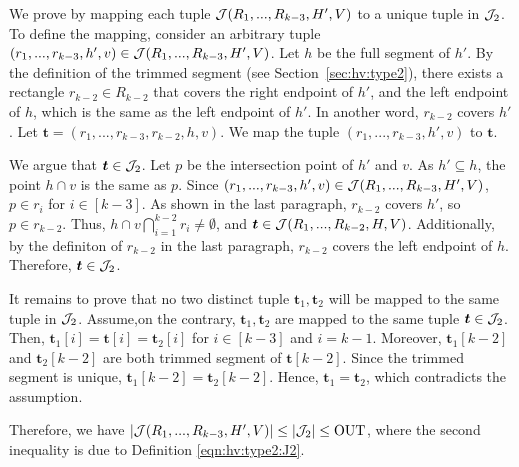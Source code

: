 We prove by mapping each tuple $\mathcal{J}(R_1,...,R_{k-3},H',V)$ to a unique tuple in $\mathcal{J}_2$. 
To define the mapping, consider an arbitrary tuple $(r_1,...,r_{k-3}, h', v) \in \mathcal{J}(R_1,...,R_{k-3},H',V)$. Let $h$ be the full segment of $h'$. By the definition of the trimmed segment (see Section~\ref{sec:hv:type2}), there exists a rectangle $r_{k-2}\in R_{k-2}$ that covers the right endpoint of $h'$, and the left endpoint of $h$, which is the same as the left endpoint of $h'$. In another word, $r_{k-2}$ covers $h'$. Let $\bm{t} = (r_1,...,r_{k-3}, r_{k-2},h,v)$. We map the tuple $(r_1,...,r_{k-3}, h', v)$ to $\bm{t}$. 

\vgap 

We argue that $\textrm{\boldmath${t}$}\in \mathcal{J}_2$. Let $p$ be the intersection point of $h'$ and $v$. As $h' \subseteq h$, the point $h\cap v$ is the same as $p$.
Since $(r_1,...,r_{k-3}, h', v) \in \mathcal{J}(R_1,...,R_{k-3},H',V)$, $p \in r_i$ for $i \in [k-3]$. As shown in the last paragraph, $r_{k-2}$ covers $h'$, so $p \in r_{k-2}$. Thus, $h \cap v \bigcap_{i = 1}^{k-2}r_i \neq \emptyset$, and $\textrm{\boldmath${t}$} \in \mathcal{J}(R_1,...,R_{k-2},H,V)$.
 Additionally, by the definiton of $r_{k-2}$ in the last paragraph, $r_{k-2}$ covers the left endpoint of $h$. Therefore, $\textrm{\boldmath${t}$} \in \mathcal{J}_2$.

\vgap

It remains to prove that no two distinct tuple $\bm{t}_1, \bm{t}_2$ will be mapped to the same tuple in $\mathcal{J}_2$. Assume,on the contrary, $\bm{t}_1, \bm{t}_2$ are mapped to the same tuple $\textrm{\boldmath${t}$} \in \mathcal{J}_2$. Then, $\bm{t}_1[i] = \bm{t}[i] = \bm{t}_2[i]$ for $i\in [k-3]$ and $i = k-1$. Moreover, $\bm{t}_1[k-2]$ and $\bm{t}_2[k-2]$ are both trimmed segment of $\bm{t}[k-2]$. Since the trimmed segment is unique, $\bm{t}_1[k-2] = \bm{t}_2[k-2]$. Hence, $\bm{t}_1 = \bm{t}_2$, which contradicts the assumption.  

\vgap

Therefore, we have $|\mathcal{J}(R_1,...,R_{k-3},H',V)| \le |\mathcal{J}_2| \le \mathrm{OUT}$, where the second inequality is due to Definition \eqref{eqn:hv:type2:J2}. 
